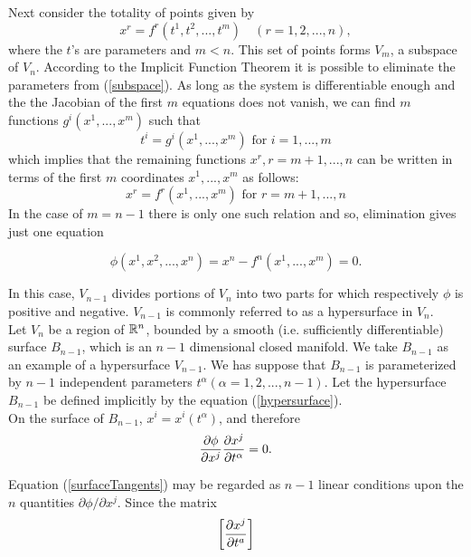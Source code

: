 Next consider the totality of points given by 
\begin{equation} x^r = f^r(t^1, t^2, ..., t^m)\quad (r= 1,2,...,n),\label{subspace}\end{equation}
where the $t$'s are parameters and $m<n$. This set of points forms $V_m$, a subspace of $V_n$. 
According to the Implicit Function Theorem it is possible to eliminate the parameters from (\ref{subspace}). As long as the system is differentiable enough and the the Jacobian of the first $m$ equations does not vanish, we can 
find $m$ functions $g^i(x^1,...,x^m)$ such that  \begin{equation} t^i = g^i(x^1,...,x^m) \mbox{ for } i = 1,...,m\end{equation}which implies that the remaining functions $x^r, r = m+1,...,n$ can be written in terms of the first $m$ coordinates 
$x^1, ..., x^m$ as follows:
\begin{equation} x^r = f^r(x^1, ..., x^m) \mbox{ for } r = m+1, ..., n\end{equation} In the case of $m=n-1$ there is only one such relation and
so, elimination gives just one equation 

\begin{equation} \phi(x^1, x^2, ..., x^n) = x^n - f^n(x^1,...,x^m) = 0.\label{hypersurface}\end{equation}

In this case, $V_{n-1}$ divides portions of $V_n$ into two parts for which respectively $\phi$ is positive and negative. $V_{n-1}$ is commonly referred to as a {\elevenit hypersurface} in $V_n$.\\

Let $V_{n}$ be a region of $\mathbb{R}^n$, bounded by a smooth (i.e. sufficiently differentiable) surface $B_{n-1}$, which is an $n-1$ dimensional closed manifold. We take $B_{n-1}$ as an example of a hypersurface $V_{n-1}$.
We has suppose that $B_{n-1}$ is parameterized by $n-1$ independent parameters $t^\alpha (\alpha = 1,2,...,n-1)$. Let the hypersurface $B_{n-1}$ be defined implicitly by the equation (\ref{hypersurface}).\\

On the surface of $B_{n-1}$, $x^i = x^i(t^\alpha)$, and therefore
\begin{equation} {\partial \phi\over \partial x^j}{\partial x^j\over \partial t^\alpha} = 0. \label{surfaceTangents} \end{equation}

Equation (\ref{surfaceTangents}) may be regarded as $n-1$  linear conditions upon the $n$ quantities ${\partial \phi / \partial x^j}$. Since the matrix 
$$\left[
{\partial x^j \over \partial t^a} 
\right]$$

